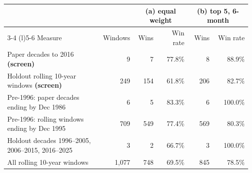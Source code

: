 \begin{tabular}{@{}lrrrrr@{}}
\toprule
& & \multicolumn{2}{c}{(a) equal weight} & \multicolumn{2}{c}{(b) top 5, 6-month} \\
\cmidrule(lr){3-4} \cmidrule(l){5-6}
Measure & Windows & Wins & Win rate & Wins & Win rate \\ \midrule
Paper decades to 2016 \textbf{(screen)} & 9 & 7 & 77.8\% & 8 & 88.9\% \\
Holdout rolling 10-year windows \textbf{(screen)} & 249 & 154 & 61.8\% & 206 & 82.7\% \\
\midrule
Pre-1996: paper decades ending by Dec 1986 & 6 & 5 & 83.3\% & 6 & 100.0\% \\
Pre-1996: rolling windows ending by Dec 1995 & 709 & 549 & 77.4\% & 569 & 80.3\% \\
Holdout decades 1996--2005, 2006--2015, 2016--2025 & 3 & 2 & 66.7\% & 3 & 100.0\% \\
All rolling 10-year windows & 1,077 & 748 & 69.5\% & 845 & 78.5\% \\
\bottomrule
\end{tabular}
